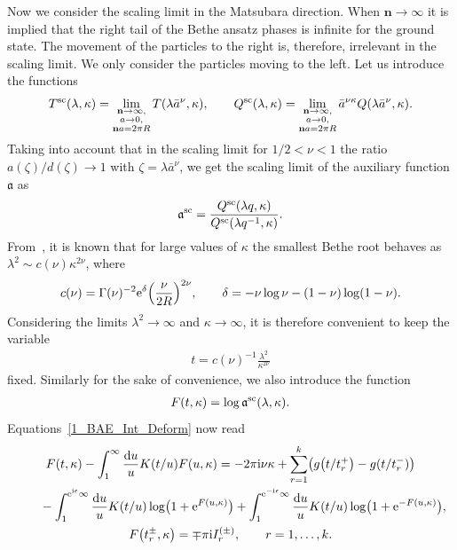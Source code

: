 \documentclass[pdftex]{sigma}
\numberwithin{equation}{section}
\begin{document}
Now we consider the scaling limit in the Matsubara direction. When $\textbf{n}\rightarrow\infty$ it is implied that the right tail of the Bethe ansatz phases is infinite for the ground state. The movement of the particles to the right is, therefore, irrelevant in the scaling limit. We only consider the particles moving to the left. Let us introduce the functions
\begin{align*}
T^{{\rm sc}}(\lambda, \kappa)=
\lim\limits_{\substack{\textbf{n}\rightarrow\infty,\\ a\rightarrow 0,\\ \mathbf{n}a=2\pi R}}
T(\lambda\bar{a}^\nu, \kappa), \qquad
Q^{{\rm sc}}(\lambda, \kappa)=
\lim\limits_{\substack{\textbf{n}\rightarrow\infty,\\ a\rightarrow 0,\\ \mathbf{n}a=2\pi R}}
\bar{a}^{\nu\kappa}
Q(\lambda\bar{a}^\nu, \kappa).
\end{align*}
Taking into account that in the scaling limit for $1/2<\nu<1$ the ratio $a(\zeta)/d(\zeta)\rightarrow 1$ with $\zeta=\lambda\bar{a}^\nu$, we get the scaling limit of the auxiliary function $\mathfrak{a}$ as
\begin{align*}
\mathfrak{a}^{{\rm sc}}=\frac{Q^{{\rm sc}}(\lambda q, \kappa)}{Q^{{\rm sc}}(\lambda q^{-1}, \kappa)}.
\end{align*}
From~\cite{BLZ_2}, it is known that for large values of $\kappa$ the smallest Bethe root behaves as $\lambda^2\sim c(\nu)\kappa^{2\nu}$, where
\begin{align*}%
c(\nu)=\Gamma(\nu)^{-2}{\rm e}^\delta\Bigl(\frac{\nu}{2R}\Bigr)^{2\nu},
\qquad
\delta=-\nu\log\nu-(1-\nu)\log(1-\nu).
\end{align*}
Considering the limits  $\lambda^2 \rightarrow \infty$ and $\kappa \rightarrow \infty$, it is therefore convenient to keep the variable
\begin{align*}
t=c(\nu)^{-1}\frac{\lambda^2}{\kappa^{2\nu}}
\end{align*}
fixed. Similarly for the sake of convenience, we also introduce the function
\begin{align*}
F(t, \kappa)=\log\mathfrak{a}^{\rm sc}(\lambda, \kappa).
\end{align*}
Equations~\eqref{1_BAE_Int_Deform} now read
\begin{gather}
F(t, \kappa)-\int_{1}^{\infty}\frac{{\rm d}u}{u}K(t/u)F(u, \kappa)=
-2\pi {\rm i} \nu\kappa + \sum_{r=1}^{k}\bigl(g\bigl(t/t^+_r\bigr)-g(t/t^-_r)\bigr) \nonumber\\
\qquad{}    -\int_1^{{\rm e}^{ {\rm i}\epsilon}\infty} \frac{{\rm d}u}{u} K(t/u)\log\bigl(1+{\rm e}^{ F(u, \kappa)}\bigr)
             +\int_1^{{\rm e}^{-{\rm i}\epsilon}\infty} \frac{{\rm d}u}{u} K(t/u)\log\bigl(1+{\rm e}^{-F(u, \kappa)}\bigr), \nonumber\\
 F\bigl(t^\pm_r, \kappa\bigr)=\mp \pi {\rm i} I^{(\pm)}_r, \qquad r=1, \dots, k.\label{1_F_Int}
\end{gather}
\end{document}
